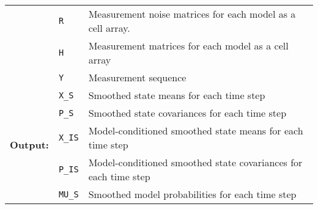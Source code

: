 \begin{tabular*}{\textwidth}{@{\extracolsep{\fill}} | p{} p{} p{} |  }
 & \texttt{R} & Measurement noise matrices for each model as a cell array. \\
 & \texttt{H} & Measurement matrices for each model as a cell array \\
 & \texttt{Y} & Measurement sequence \\
\hline
\multirow{5}{*}{\bf Output:}
 & \texttt{X\_S} & Smoothed state means for each time step \\
 & \texttt{P\_S} & Smoothed state covariances for each time step \\
 & \texttt{X\_IS} & Model-conditioned smoothed state means for each time step \\
 & \texttt{P\_IS} & Model-conditioned smoothed state covariances for each time step \\
 & \texttt{MU\_S} & Smoothed model probabilities for each time step
     \\
\hline
\end{tabular*}
